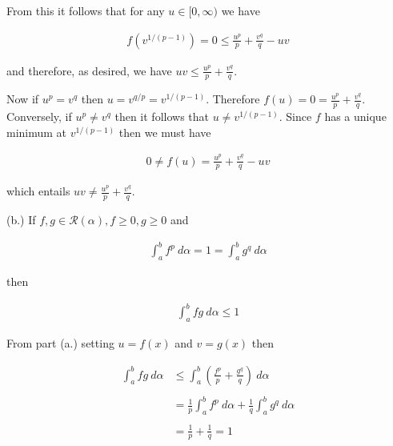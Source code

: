 \documentclass{article}
\begin{document}
  From this it follows that for any $u\in[0,\infty)$ we have

  \begin{align*}
    f(v^{1/(p-1)}) = 0 \leq \frac{u^p}{p}+\frac{v^q}{q}-uv
  \end{align*}

  and therefore, as desired, we have $uv\leq \frac{u^p}{p}+\frac{v^q}{q}$.

  \vspace{1cm}

  Now if $u^p=v^q$ then $u=v^{q/p}=v^{1/(p-1)}$.  Therefore $f(u)=0=\frac{u^p}{p}+\frac{v^q}{q}$. Conversely, if $u^p\ne v^{q}$ then it follows that $u\ne v^{1/(p-1)}$.  Since $f$ has a unique minimum at $v^{1/(p-1)}$ then we must have

  \begin{align*}
    0 \ne f(u) = \frac{u^p}{p}+\frac{v^q}{q}-uv
  \end{align*}

  which entails $uv\ne \frac{u^p}{p}+\frac{v^q}{q}$.

  \vspace{1cm}

  {\Large \color{Sepia} (b.) If $f,g \in \mathscr R(\alpha), f\geq 0,g\geq 0$ and

  \begin{align*}
    \int_a^b f^p\ d\alpha = 1 = \int_a^b g^q \ d\alpha
  \end{align*}

  then

  \begin{align*}
    \int_a^b fg \ d\alpha \leq 1
  \end{align*}

  }

  \vspace{1cm}

  From part (a.) setting $u=f(x)$ and $v=g(x)$ then

  \begin{align*}
    \int_a^b fg \ d\alpha &\leq \int_a^b \left(\frac{f^p}{p}+\frac{g^q}{q}\right) \ d\alpha \\\\
    &= \frac 1 p \int_a^b f^p \ d\alpha + \frac 1 q \int_a^b g^q \ d\alpha \\\\
    &= \frac 1 p +\frac 1 q = 1
  \end{align*}

  \vspace{1cm}
\end{document}

